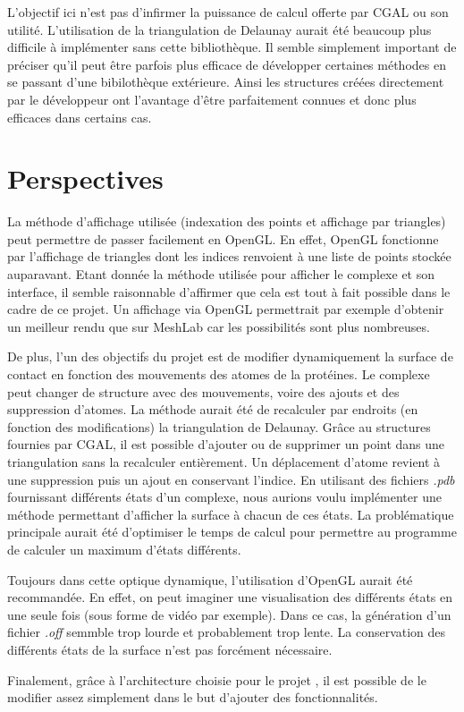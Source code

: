 L'objectif ici n'est pas d'infirmer la puissance de calcul offerte par CGAL ou son utilité.
L'utilisation de la triangulation de Delaunay aurait été beaucoup plus difficile
à implémenter sans cette bibliothèque. Il semble simplement important de préciser qu'il peut être
parfois plus efficace de développer certaines méthodes en se passant d'une bibilothèque extérieure.
Ainsi les structures créées directement par le développeur ont l'avantage d'être
parfaitement connues et donc plus efficaces dans certains cas.

\section{Perspectives}

La méthode d'affichage utilisée (indexation des points et affichage par triangles)
peut permettre de passer facilement en OpenGL. En effet, OpenGL fonctionne par l'affichage
de triangles dont les indices renvoient à une liste de points stockée auparavant.
Etant donnée la méthode utilisée pour afficher le complexe et son interface, il semble
raisonnable d'affirmer que cela est tout à fait possible dans le cadre de ce projet.
Un affichage via OpenGL permettrait par exemple d'obtenir un meilleur rendu que sur
MeshLab car les possibilités sont plus nombreuses.

De plus, l'un des objectifs du projet est de modifier dynamiquement la surface de contact
en fonction des mouvements des atomes de la protéines. Le complexe peut changer de structure
avec des mouvements, voire des ajouts et des suppression d'atomes. La méthode aurait été
de recalculer par endroits (en fonction des modifications) la triangulation de Delaunay.
Grâce au structures fournies par CGAL, il est possible d'ajouter ou de supprimer
un point dans une triangulation sans la recalculer entièrement. Un déplacement d'atome
revient à une suppression puis un ajout en conservant l'indice. En utilisant des fichiers \textit{.pdb}
fournissant différents états d'un complexe, nous aurions voulu implémenter une méthode
permettant d'afficher la surface à chacun de ces états. La problématique principale
aurait été d'optimiser le temps de calcul pour permettre au programme de calculer un maximum
d'états différents.

Toujours dans cette optique dynamique, l'utilisation d'OpenGL aurait été recommandée.
En effet, on peut imaginer une visualisation des différents états en une seule fois (sous
forme de vidéo par exemple). Dans ce cas, la génération d'un fichier \textit{.off}
semmble trop lourde et probablement trop lente. La conservation des différents états de
la surface n'est pas forcément nécessaire.

Finalement, grâce à l'architecture choisie pour le projet , il est possible de le
modifier assez simplement dans le but d'ajouter des fonctionnalités.
